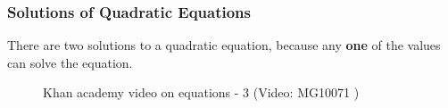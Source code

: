 \label{m39247*secfhsst!!!underscore!!!id2128}
            \subsubsection{  Solutions of Quadratic Equations }
            \nopagebreak
            
        \label{m39247*id150373}There are two solutions to a
quadratic equation, because any \textbf{one} of the values can solve the
equation. \par 

\label{m39247*eip-388}
    \setcounter{subfigure}{0}


	\begin{figure}[H] %
    
    
    \textnormal{Khan academy video on equations - 3}\vspace{.1in} \nopagebreak
  \label{m39247*yt-media3}\label{m39247*yt-video3}
             { (Video:  MG10071 )}
      
      \vspace{2pt}
    \vspace{.1in}
    
    

 \end{figure}   

    \addtocounter{footnote}{-0}
    \par \label{m39247*secfhsst!!!underscore!!!id2133}\vspace{.5cm} 
      
